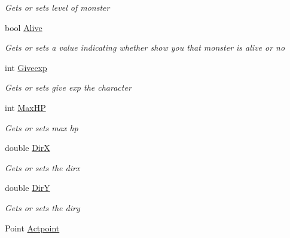 \begin{DoxyCompactItemize}
\begin{DoxyCompactList}\small\item\em Gets or sets level of monster \end{DoxyCompactList}\item 
bool \hyperlink{class_lightdeath_1_1_monsters_a0ba7cc244a302984a838cde8a112dd66}{Alive}
\begin{DoxyCompactList}\small\item\em Gets or sets a value indicating whether show you that monster is alive or no \end{DoxyCompactList}\item 
int \hyperlink{class_lightdeath_1_1_monsters_a43054a345f7078a0bc288e668ea7d6c5}{Giveexp}
\begin{DoxyCompactList}\small\item\em Gets or sets give exp the character \end{DoxyCompactList}\item 
int \hyperlink{class_lightdeath_1_1_monsters_aaa9885e83e578ef1efc6dffa24b050e5}{Max\+HP}
\begin{DoxyCompactList}\small\item\em Gets or sets max hp \end{DoxyCompactList}\item 
double \hyperlink{class_lightdeath_1_1_monsters_a9fc8257458767323affd7ca9feae0b65}{DirX}
\begin{DoxyCompactList}\small\item\em Gets or sets the dirx \end{DoxyCompactList}\item 
double \hyperlink{class_lightdeath_1_1_monsters_a2400b8efb33b0df96471516e30e44862}{DirY}
\begin{DoxyCompactList}\small\item\em Gets or sets the diry \end{DoxyCompactList}\item 
Point \hyperlink{class_lightdeath_1_1_monsters_a387b8fec5906af5d857dc861340fc783}{Actpoint}

\end{DoxyCompactItemize}
